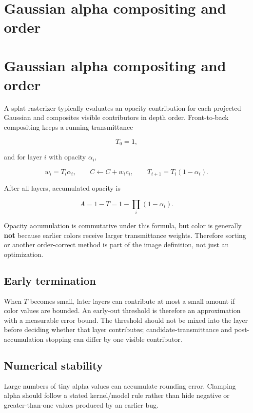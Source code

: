 \hypertarget{appendix-5f4b2e24c3f6}{}
\section*{Gaussian alpha compositing and order}
\section{Gaussian alpha compositing and order}\label{appendix-5f4b2e24c3f6-gaussian-alpha-compositing-and-order}

A splat rasterizer typically evaluates an opacity contribution for each projected Gaussian and composites visible contributors in depth order. Front-to-back compositing keeps a running transmittance

\[
T_0=1,
\]

and for layer \(i\) with opacity \(\alpha_i\),

\[
w_i=T_i\alpha_i,
\qquad
C \leftarrow C+w_i c_i,
\qquad
T_{i+1}=T_i(1-\alpha_i).
\]

After all layers, accumulated opacity is

\[
A=1-T
=
1-\prod_i(1-\alpha_i).
\]

Opacity accumulation is commutative under this formula, but color is generally \textbf{not} because earlier colors receive larger transmittance weights. Therefore sorting or another order-correct method is part of the image definition, not just an optimization.

\subsection{Early termination}\label{appendix-5f4b2e24c3f6-early-termination}

When \(T\) becomes small, later layers can contribute at most a small amount if color values are bounded. An early-out threshold is therefore an approximation with a measurable error bound. The threshold should not be mixed into the layer before deciding whether that layer contributes; candidate-transmittance and post-accumulation stopping can differ by one visible contributor.

\subsection{Numerical stability}\label{appendix-5f4b2e24c3f6-numerical-stability}

Large numbers of tiny alpha values can accumulate rounding error. Clamping alpha should follow a stated kernel/model rule rather than hide negative or greater-than-one values produced by an earlier bug.

